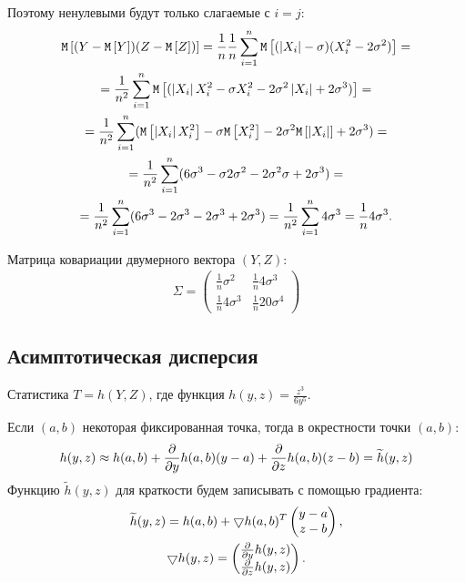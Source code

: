 Поэтому ненулевыми будут только слагаемые с $i=j$:
\begin{multline}
    \mathtt{M} \left [ ( Y - \mathtt{M} \left [ Y \right ] ) ( Z - \mathtt{M} \left [ Z \right ])  \right ]
    = \frac{1}{n} \frac{1}{n} \sum_{i=1}^{n} \mathtt{M} \left [  ( \left | X_i \right | - \sigma ) ( X_i^2 - 2 \sigma^2 )  \right ] = \\
    = \frac{1}{n^2} \sum_{i=1}^{n} \mathtt{M} \left [  ( \left | X_i \right | X_i^2 - \sigma X_i^2 - 2 \sigma^2 \left | X_i \right | + 2 \sigma^3 )  \right ] = \\
    = \frac{1}{n^2} \sum_{i=1}^{n} ( \mathtt{M} \left [ \left | X_i \right | X_i^2 \right ] - \sigma \mathtt{M} \left [ X_i^2 \right ] - 2 \sigma^2 \mathtt{M} \left [ \left | X_i \right | \right ] + 2 \sigma^3 ) = \\
    = \frac{1}{n^2} \sum_{i=1}^{n} ( 6 \sigma^3 - \sigma 2 \sigma^2 - 2 \sigma^2 \sigma + 2 \sigma^3 ) = \\
    = \frac{1}{n^2} \sum_{i=1}^{n} ( 6 \sigma^3 - 2 \sigma^3 - 2 \sigma^3 + 2 \sigma^3 )
    = \frac{1}{n^2} \sum_{i=1}^{n} 4 \sigma^3
    = \frac{1}{n} 4 \sigma^3 .
\end{multline}

Матрица ковариации двумерного вектора $(Y, Z)$:
\begin{gather}
    \Sigma =
    \begin{pmatrix}
        \frac{1}{n} \sigma^2   & \frac{1}{n} 4 \sigma^3  \\
        \frac{1}{n} 4 \sigma^3 & \frac{1}{n} 20 \sigma^4
    \end{pmatrix}
\end{gather}

\subsection*{Асимптотическая дисперсия}

Статистика $T = h(Y,Z)$, где функция $h(y,z) = \frac{z^3}{6y^5}$.

Если $(a, b)$ некоторая фиксированная точка, тогда в окрестности точки $(a, b)$:
\begin{equation}
    h(y, z) \approx h(a, b) + \frac{\partial}{\partial y} h(a, b) ( y - a ) + \frac{\partial}{\partial z} h(a, b) (z - b) = \widetilde{h}(y, z)
\end{equation}
Функцию $\widetilde{h}(y,z)$ для краткости будем записывать с помощью градиента:
\begin{gather}
    \widetilde{h}(y, z) = h(a, b) + \bigtriangledown h(a, b)^T \begin{pmatrix}
                                                                   y - a \\ z - b
    \end{pmatrix} , \\
    \bigtriangledown h(y, z) = \begin{pmatrix}
                                   \frac{\partial}{\partial y} h(y, z) \\ \frac{\partial}{\partial z} h(y, z)
    \end{pmatrix} .
\end{gather}

